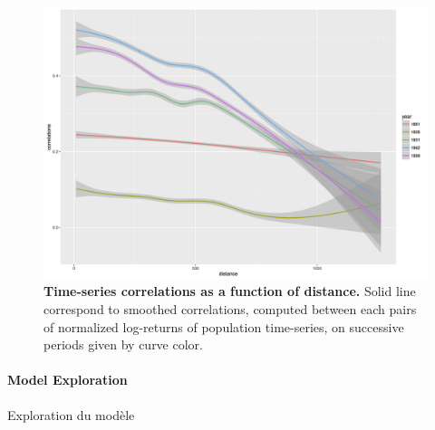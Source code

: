 \begin{figure}
\centering
\includegraphics[width=\textwidth]{Figures/InteractionGibrat/Fig1}
\caption{\textbf{Time-series correlations as a function of distance.} Solid line correspond to smoothed correlations, computed between each pairs of normalized log-returns of population time-series, on successive periods given by curve color.}
\label{fig:interactiongibrat:ts-correlations}
\end{figure}





\paragraph{Model Exploration}{Exploration du modèle}




